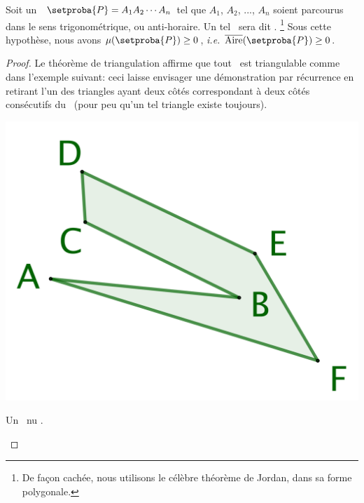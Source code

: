 \begin{fact} \label{route-direction}
    Soit un \ngone\ $\setproba{P} = A_1 A_2 \cdots A_n$ tel que $A_1$, $A_2$, ..., $A_n$ soient parcourus dans le sens trigonométrique, ou anti-horaire.
    Un tel \ngone\ sera dit .%
    \footnote{
    	De façon cachée, nous utilisons le célèbre théorème de Jordan, dans sa forme polygonale.
    }
    Sous cette hypothèse, nous avons 
    $\mu(\setproba{P}) \geq 0$,
    \emph{i.e.}
    $\sarea{\setproba{P}} \geq 0$.
\end{fact}


\begin{proof}
	Le théorème de triangulation affirme que tout \ngone\ est triangulable comme dans l'exemple suivant: ceci laisse envisager une démonstration par récurrence en retirant l'un des triangles ayant deux côtés correspondant à deux côtés consécutifs du \ngone\ (pour peu qu'un tel triangle existe toujours).


    \begin{multicols}{3}
        \small\itshape
        \begin{center}
            \includegraphics[scale=.4]{content/polygon/alg-area/triangulation-1.png}

            \smallskip
            Un \ngone\ \og nu \fg.
        \end{center}



\end{multicols}
\end{proof}
